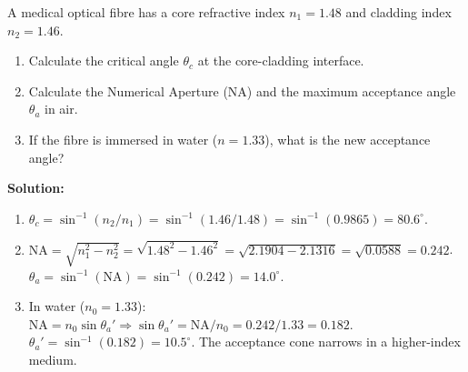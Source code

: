 \documentclass[11pt]{article}
\begin{document}
\begin{exoresolu}
A medical optical fibre has a core refractive index $n_1 = 1.48$ and cladding index $n_2 = 1.46$.
\begin{enumerate}
    \item Calculate the critical angle $\theta_c$ at the core-cladding interface.
    \item Calculate the Numerical Aperture (NA) and the maximum acceptance angle $\theta_a$ in air.
    \item If the fibre is immersed in water ($n=1.33$), what is the new acceptance angle?
\end{enumerate}
\tcblower
\textbf{Solution:}
\begin{enumerate}
    \item $\theta_c = \sin^{-1}(n_2/n_1) = \sin^{-1}(1.46/1.48) = \sin^{-1}(0.9865) = \mathbf{80.6^\circ}$.
    \item $\text{NA} = \sqrt{n_1^2 - n_2^2} = \sqrt{1.48^2 - 1.46^2} = \sqrt{2.1904 - 2.1316} = \sqrt{0.0588} = \mathbf{0.242}$.
    $\theta_a = \sin^{-1}(\text{NA}) = \sin^{-1}(0.242) = \mathbf{14.0^\circ}$.
    \item In water ($n_0=1.33$): $\text{NA} = n_0 \sin \theta_a' \Rightarrow \sin \theta_a' = \text{NA}/n_0 = 0.242/1.33 = 0.182$.
    $\theta_a' = \sin^{-1}(0.182) = \mathbf{10.5^\circ}$. The acceptance cone narrows in a higher-index medium.
\end{enumerate}
\end{exoresolu}
\end{document}
